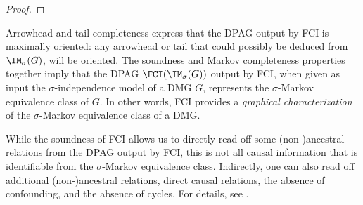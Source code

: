 \begin{proof}

\end{proof}
Arrowhead and tail completeness express that the DPAG output by FCI is maximally oriented: any arrowhead or tail that could possibly be deduced from $\IM_\sigma(G)$, will be oriented.
The soundness and Markov completeness properties together imply that the DPAG $\FCI(\IM_\sigma(G))$ output by FCI, when given as input the $\sigma$-independence model of a DMG $G$, represents the $\sigma$-Markov equivalence class of $G$.
In other words, FCI provides a \emph{graphical characterization} of the $\sigma$-Markov equivalence class of a DMG.

While the soundness of FCI allows us to directly read off some (non-)ancestral relations from the DPAG output by FCI, 
this is not all causal information that is identifiable from the $\sigma$-Markov equivalence class. 
Indirectly, one can also read off additional (non-)ancestral relations, direct causal relations, the absence of confounding, and the absence of cycles. 
For details, see \cite{MooijClaassen_UAI_20}.

